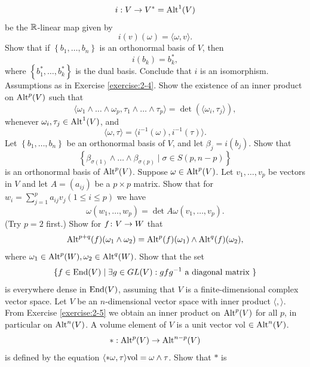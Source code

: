 \begin{enumerate}[\theexercise.1]
    \[
      i : V \rightarrow  {V}^* = {\operatorname{Alt}}^{1}( V)
    \]
    be the $\mathbb{R}$-linear map given by
    \[
      i( v) ( \omega )  = \langle \omega,v\rangle.
    \]
    Show that if $\left\{  {b_1,\ldots,{b}_{n}}\right\}$ is an orthonormal basis of $V$, then
    \[
      i( {b}_{k})  = {b}_{k}^*,
    \]
    where $\left\{  {b_1^*,\ldots,{b}_{k}^*}\right\}$ is the dual basis. Conclude
    that $i$ is an isomorphism.
  \NewItem Assumptions as in Exercise \ref{exercise:2-4}. Show the existence of an inner product on ${\operatorname{Alt}}^{p}( V)$
    such that
    \[
      \langle  {{\omega }_{1} \land  \ldots  \land  {\omega }_{p}, {\tau }_{1} \land  \ldots  \land  {\tau }_{p}}\rangle
      = \det ( \langle  {{\omega }_{i},{\tau }_{j}}\rangle  ),
    \]
    whenever ${\omega }_{i},{\tau }_{j} \in  {\operatorname{Alt}}^{1}( V)$, and
    \[
      \langle \omega,\tau \rangle  = \langle  {{i}^{-1}( \omega ),{i}^{-1}( \tau ) }\rangle .
    \]
    Let $\left\{  {b_1,\ldots,{b}_{n}}\right\}$ be an orthonormal basis of $V$, and let ${\beta }_{j} = i( {b}_{j})$.
    Show that
    \[
      \left\{  {{\beta }_{\sigma ( 1) } \land  \ldots  \land  {\beta }_{\sigma ( p) } \mid  \sigma  \in  S( {p,n- p}) }\right\}
    \]
    is an orthonormal basis of ${\operatorname{Alt}}^{p}( V)$.
  \NewItem Suppose $\omega  \in  {\operatorname{Alt}}^{p}( V)$. Let ${v}_{1},\ldots,{v}_{p}$ be vectors in $V$ and let $A = ( {a}_{ij})$ be
    a $p \times  p$ matrix. Show that for ${w}_{i} = \sum_{{j = 1}}^{p}{a}_{ij}{v}_{j}( {1 \leq  i \leq  p})$
    we have
    \[
      \omega ( {{w}_{1},\ldots,{w}_{p}})  = \det {A\omega }( {{v}_{1},\ldots,{v}_{p}}).
    \]
    (Try $p = 2$ first.)
  \NewItem Show for $f\colon V \rightarrow  W$ that
    \[
      {\operatorname{Alt}}^{p + q}( f) ( {{\omega }_{1} \land  {\omega }_{2}})  = {\operatorname{Alt}}^{p}( f) ( {\omega }_{1})  \land  {\operatorname{Alt}}^{q}( f) ( {\omega }_{2}),
    \]
    where ${\omega }_{1} \in  {\operatorname{Alt}}^{p}( W),{\omega }_{2} \in  {\operatorname{Alt}}^{q}( W)$.
  \NewItem Show that the set
    \[
      \{ f \in  \mathrm{End}( V)  \mid  \exists g \in  {GL}( V): {gf}{g}^{-1}\text{ a diagonal matrix }\}
    \]
    is everywhere dense in $\mathrm{End}( V)$, assuming that $V$ is a finite-dimensional complex vector space.
  \NewItem Let $V$ be an $n$-dimensional vector space with inner product $\langle,\rangle$. From
    Exercise \ref{exercise:2-5} we obtain an inner product on ${\operatorname{Alt}}^{p}( V)$ for all $p$, in particular on ${\operatorname{Alt}}^{n}( V)$.
    A volume element of $V$ is a unit vector vol $\in  {\operatorname{Alt}}^{n}( V)$. 
    \[
      *:{\operatorname{Alt}}^{p}( V)  \rightarrow  {\operatorname{Alt}}^{n- p}( V)
    \]
    is defined by the equation $\langle * \omega,\tau \rangle \mathrm{vol} = \omega  \land  \tau$. Show that $*$ is

\end{enumerate}
